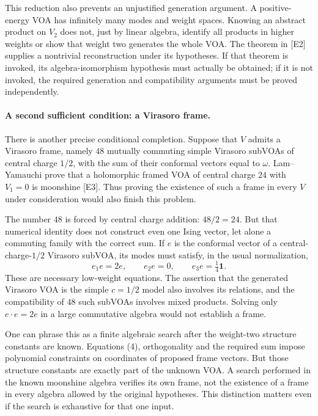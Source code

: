 \documentclass[11pt]{article}
\begin{document}
This reduction also prevents an unjustified generation argument. A positive-energy VOA has infinitely many modes and weight spaces. Knowing an abstract product on $V_2$ does not, just by linear algebra, identify all products in higher weights or show that weight two generates the whole VOA. The theorem in [E2] supplies a nontrivial reconstruction under its hypotheses. If that theorem is invoked, its algebra-isomorphism hypothesis must actually be obtained; if it is not invoked, the required generation and compatibility arguments must be proved independently.

\paragraph{A second sufficient condition: a Virasoro frame.}
There is another precise conditional completion. Suppose that $V$ admits a Virasoro frame, namely $48$ mutually commuting simple Virasoro subVOAs of central charge $1/2$, with the sum of their conformal vectors equal to $\omega$. Lam--Yamauchi prove that a holomorphic framed VOA of central charge $24$ with $V_1=0$ is moonshine [E3]. Thus proving the existence of such a frame in every $V$ under consideration would also finish this problem.

The number $48$ is forced by central charge addition: $48/2=24$. But that numerical identity does not construct even one Ising vector, let alone a commuting family with the correct sum. If $e$ is the conformal vector of a central-charge-$1/2$ Virasoro subVOA, its modes must satisfy, in the usual normalization,
\[
 e_1e=2e,\qquad e_2e=0,\qquad e_3e=\tfrac14\mathbf1.
                                                               \tag{4}
\]
These are necessary low-weight equations. The assertion that the generated Virasoro VOA is the simple $c=1/2$ model also involves its relations, and the compatibility of $48$ such subVOAs involves mixed products. Solving only $e\cdot e=2e$ in a large commutative algebra would not establish a frame.

One can phrase this as a finite algebraic search after the weight-two structure constants are known. Equations (4), orthogonality and the required sum impose polynomial constraints on coordinates of proposed frame vectors. But those structure constants are exactly part of the unknown VOA. A search performed in the known moonshine algebra verifies its own frame, not the existence of a frame in every algebra allowed by the original hypotheses. This distinction matters even if the search is exhaustive for that one input.
\end{document}
